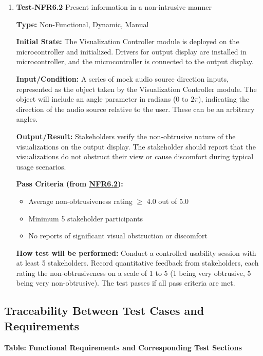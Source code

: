 \documentclass[12pt, titlepage]{article}
\begin{document}
\begin{enumerate}
					
\item{\textbf{Test-NFR6.2} Present information in a non-intrusive manner\\}

\textbf{Type:} Non-Functional, Dynamic, Manual
					
\textbf{Initial State:} 
The Visualization Controller module is deployed on the microcontroller and
initialized. Drivers for output display are installed in microcontroller, and
the microcontroller is connected to the output display. 
					
\textbf{Input/Condition:} 
A series of mock audio source direction inputs, represented as the object taken
by the Visualization Controller module. The object will include an angle
parameter in radians (0 to $2\pi$), indicating the direction of the audio source
relative to the user. These can be an arbitrary angles.
					
\textbf{Output/Result:} 
Stakeholders verify the non-obtrusive nature of the visualizations on the
output display. The stakeholder should report that the visualizations do not
obstruct their view or cause discomfort during typical usage scenarios.

\textbf{Pass Criteria (from \hyperref[SRS-NFR6_2]{NFR6.2}):}
\begin{itemize}
\item Average non-obtrusiveness rating $\geq$ 4.0 out of 5.0
\item Minimum 5 stakeholder participants
\item No reports of significant visual obstruction or discomfort
\end{itemize}

\textbf{How test will be performed:} 
Conduct a controlled usability session with at least 5 stakeholders. Record
quantitative feedback from stakeholders, each rating the non-obtrusiveness on a
scale of 1 to 5 (1 being very obtrusive, 5 being very non-obtrusive). The test
passes if all pass criteria are met.

\end{enumerate}

\subsection{Traceability Between Test Cases and Requirements}

\noindent
\textbf{Table: Functional Requirements and Corresponding Test Sections}
\end{document}
